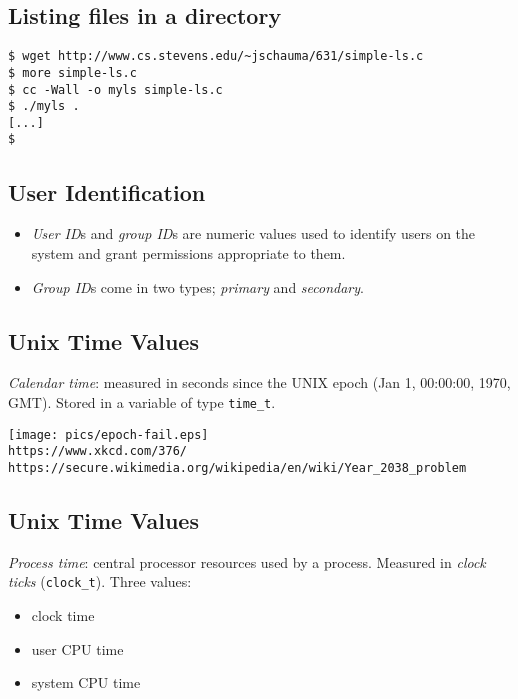 \documentclass[xga]{xdvislides}
\begin{document}
\subsection{Listing files in a directory}
\vspace*{\fill}
\begin{verbatim}
$ wget http://www.cs.stevens.edu/~jschauma/631/simple-ls.c
$ more simple-ls.c
$ cc -Wall -o myls simple-ls.c
$ ./myls .
[...]
$
\end{verbatim}
\vspace*{\fill}


\subsection{User Identification}
\begin{itemize}
	\item {\em User ID}s and {\em group ID}s are numeric values used to
		identify users on the system and grant permissions appropriate to them.
	\item {\em Group ID}s come in two types; {\em primary} and {\em secondary}.
\end{itemize}

\subsection{Unix Time Values}
{\em Calendar time}: measured in seconds since the UNIX epoch (Jan
1, 00:00:00, 1970, GMT). Stored in a variable of type {\tt time\_t}.
\\

\begin{center}
\texttt{[image: pics/epoch-fail.eps]} \\
\verb+https://www.xkcd.com/376/+ \\
\vspace{.25in}
\verb+https://secure.wikimedia.org/wikipedia/en/wiki/Year_2038_problem+
\end{center}


\subsection{Unix Time Values}
{\em Process time}: central processor resources used by a process.
Measured in {\em clock ticks} ({\tt clock\_t}).  Three values:
\begin{itemize}
	\item clock time
	\item user CPU time
	\item system CPU time
\end{itemize}
\end{document}
